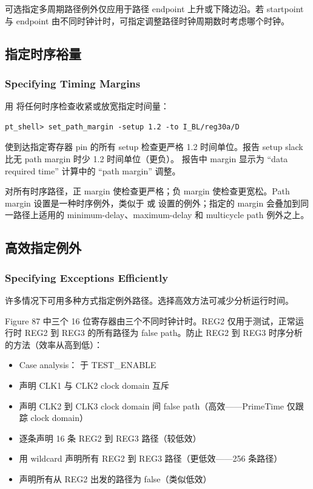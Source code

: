 可选指定多周期路径例外仅应用于路径 endpoint 上升或下降边沿。若 startpoint 与 endpoint 由不同时钟计时，可指定调整路径时钟周期数时考虑哪个时钟。

\subsection{指定时序裕量}
\subsubsection*{Specifying Timing Margins}

用  将任何时序检查收紧或放宽指定时间量：
\begin{lstlisting}
pt_shell> set_path_margin -setup 1.2 -to I_BL/reg30a/D
\end{lstlisting}

使到达指定寄存器 pin 的所有 setup 检查更严格 1.2 时间单位。报告 setup slack 比无 path margin 时少 1.2 时间单位（更负）。 报告中 margin 显示为 ``data required time'' 计算中的 ``path margin'' 调整。

对所有时序路径，正 margin 使检查更严格；负 margin 使检查更宽松。Path margin 设置是一种时序例外，类似于  或  设置的例外；指定的 margin 会叠加到同一路径上适用的 minimum-delay、maximum-delay 和 multicycle path 例外之上。

\subsection{高效指定例外}
\subsubsection*{Specifying Exceptions Efficiently}

许多情况下可用多种方式指定例外路径。选择高效方法可减少分析运行时间。


Figure 87 中三个 16 位寄存器由三个不同时钟计时。REG2 仅用于测试，正常运行时 REG2 到 REG3 的所有路径为 false path。防止 REG2 到 REG3 时序分析的方法（效率从高到低）：
\begin{itemize}
  \item Case analysis： 于 TEST\_ENABLE
  \item 声明 CLK1 与 CLK2 clock domain 互斥
  \item 声明 CLK2 到 CLK3 clock domain 间 false path（高效——PrimeTime 仅跟踪 clock domain）
  \item 逐条声明 16 条 REG2 到 REG3 路径（较低效）
  \item 用 wildcard 声明所有 REG2 到 REG3 路径（更低效——256 条路径）
  \item 声明所有从 REG2 出发的路径为 false（类似低效）
\end{itemize}


